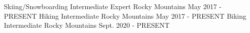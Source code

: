 

\begin{cventries}

  \cventry
    {Skiing/Snowboarding} %
    {Intermediate Expert} %
    {Rocky Mountains} %
    {May 2017 - PRESENT} %
  \cventry
    {Hiking} %
    {Intermediate} %
    {Rocky Mountains} %
    {May 2017 - PRESENT} %
  \cventry
    {Biking} %
    {Intermediate} %
    {Rocky Mountains} %
    {Sept. 2020 - PRESENT} %


\end{cventries}
